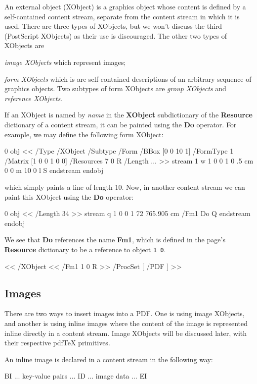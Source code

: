 An external object (XObject) is a graphics object whose content is defined by a self-contained content stream,
separate from the content stream in which it is used.
There are three types of XObjects, but we won't discuss the third (PostScript XObjects) as their use is
discouraged.
The other two types of XObjects are
\benum
    \item {\it image XObjects} which represent images;
    \item {\it form XObjects} which is are self-contained descriptions of an arbitrary sequence of
    graphics objects.
    Two subtypes of form XObjects are {\it group XObjects} and {\it reference XObjects}.
\eenum

If an XObject is named by {\it name} in the {\bf XObject} subdictionary of the {\bf Resource} dictionary of
a content stream, it can be painted using the {\bf Do} operator.
For example, we may define the following form XObject:

 0 obj
<<
    /Type /XObject
    /Subtype /Form
    /BBox [0 0 10 1]
    /FormType 1
    /Matrix [1 0 0 1 0 0]
    /Resources 7 0 R
    /Length ...
>>
stream
1 w
1 0 0 1 0 .5 cm
0 0 m 10 0 l S
endstream
endobj
\elisting

\noindent which simply paints a line of length $10$.
Now, in another content stream we can paint this XObject using the {\bf Do} operator:

 0 obj
<<
    /Length 34        
>>
stream
q
1 0 0 1 72 765.905 cm
/Fm1 Do
Q
endstream
endobj
\elisting

\noindent We see that {\bf Do} references the name {\bf Fm1}, which is defined in the page's {\bf Resource}
dictionary to be a reference to object {\tt1 0}.

\blisting
<<
    /XObject << /Fm1 1 0 R >>
    /ProcSet [ /PDF ]
>>
\elisting

\subsection{Images}

There are two ways to insert images into a PDF.
One is using image XObjects, and another is using inline images where the content of the image is represented
inline directly in a content stream.
Image XObjects will be discussed later, with their respective pdf\TeX{} primitives.

An inline image is declared in a content stream in the following way:

\blisting
BI  %
... key-value pairs ...
ID  %
... image data ...
EI  %
\elisting

